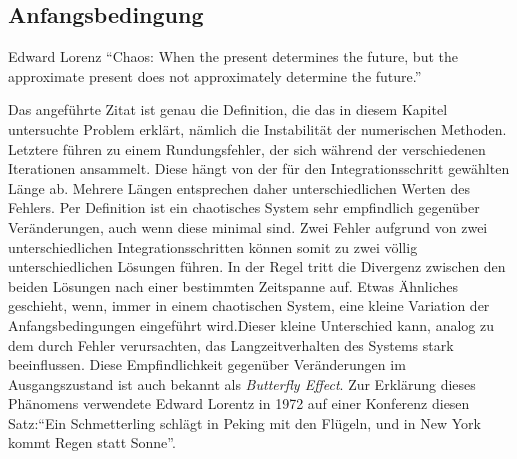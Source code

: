 \subsection{Anfangsbedingung}
\label{vanderpol:subsection:anfangsbedingung}
\begin{cquote}[30pt]{Edward Lorenz}
``Chaos: When the present determines the future, but the approximate present does not approximately determine the future.''
\end{cquote}
\noindent Das angeführte Zitat ist genau die Definition, die das in diesem Kapitel untersuchte Problem erklärt, nämlich die Instabilität der numerischen Methoden. Letztere führen zu einem Rundungsfehler, der sich während der verschiedenen Iterationen ansammelt. Diese hängt von der für den Integrationsschritt gewählten Länge ab. Mehrere Längen entsprechen daher unterschiedlichen Werten des Fehlers. Per Definition ist ein chaotisches System sehr empfindlich gegenüber Veränderungen, auch wenn diese minimal sind. Zwei Fehler aufgrund von zwei unterschiedlichen Integrationsschritten können somit zu zwei völlig unterschiedlichen Lösungen führen. In der Regel tritt die Divergenz zwischen den beiden Lösungen nach einer bestimmten Zeitspanne auf. Etwas Ähnliches geschieht, wenn, immer in einem chaotischen System, eine kleine Variation der Anfangsbedingungen eingeführt wird.Dieser kleine Unterschied kann, analog zu dem durch Fehler verursachten, das Langzeitverhalten des Systems stark beeinflussen. Diese Empfindlichkeit gegenüber Veränderungen im Ausgangszustand ist auch bekannt als {\em Butterfly Effect}. Zur Erklärung dieses Phänomens verwendete Edward Lorentz in 1972 auf einer Konferenz diesen Satz:``Ein Schmetterling schlägt in Peking mit den Flügeln, und in New York kommt Regen statt Sonne''.
